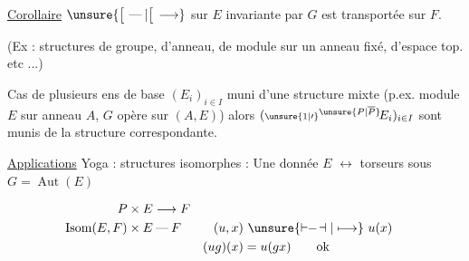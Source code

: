 \uline{Corollaire}  $\unsure{\big[\,\mathbin{\text{---}}|\big[\,\longrightarrow}$ 
sur $E$ invariante par $G$ est transportée sur $F$.

(Ex : structures de groupe, d'anneau, de module sur un anneau fixé, d'espace top. etc ...)

Cas de plusieurs ens de base $(E_i)_{i\in I}$  muni d'une structure mixte (p.ex. module $E$ sur anneau $A$, $G$ opère sur $(A,E)$) alors $({\scriptstyle\unsure{1|\prime}}{}^{\unsure{P|\overline P}}\!E_i)_{i\in I}$ sont munis de la structure correspondante.


\uline{Applications}\quad {} Yoga : structures isomorphes : Une  donnée $E$ $\longleftrightarrow$ torseurs sous $G=\operatorname{Aut}(E)$



\[
\begin{aligned}
P\times E&\longrightarrow F\\
\operatorname{Isom}(E,F)\times E&\mathbin{\text{---}} F
  & (u,x)&\ \unsure{\mathrel{\vdash\!\!-\!\dashv}|\longmapsto}\ u(x)\\
&& (ug)(x)&=u(gx)\qquad\text{ok}
\end{aligned}
\]


